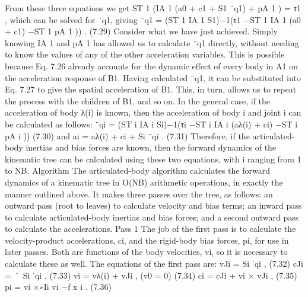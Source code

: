 From these three equations we get ST 1 (IA 1 (a0 + c1 + S1 ¨q1) + pA 1 ) = τ1 , which can be solved for ¨q1, giving ¨q1 = (ST 1 IA 1 S1)−1(τ1 −ST 1 IA 1 (a0 + c1) −ST 1 pA 1 )) . (7.29) Consider what we have just achieved. Simply knowing IA 1 and pA 1 has allowed us to calculate ¨q1 directly, without needing to know the values of any of the other acceleration variables. This is possible because Eq. 7.26 already accounts for the dynamic effect of every body in A1 on the acceleration response of B1. Having calculated ¨q1, it can be substituted into Eq. 7.27 to give the spatial acceleration of B1. This, in turn, allows us to repeat the process with the children of B1, and so on. In the general case, if the acceleration of body λ(i) is known, then the acceleration of body i and joint i can be calculated as follows: ¨qi = (ST i IA i Si)−1(τi −ST i IA i (aλ(i) + ci) −ST i pA i )) (7.30) and ai = aλ(i) + ci + Si ¨qi . (7.31) Therefore, if the articulated-body inertias and bias forces are known, then the forward dynamics of the kinematic tree can be calculated using these two equations, with i ranging from 1 to NB. Algorithm The articulated-body algorithm calculates the forward dynamics of a kinematic tree in O(NB) arithmetic operations, in exactly the manner outlined above. It makes three passes over the tree, as follows: an outward pass (root to leaves) to calculate velocity and bias terms; an inward pass to calculate articulated-body inertias and bias forces; and a second outward pass to calculate the accelerations. Pass 1 The job of the first pass is to calculate the velocity-product accelerations, ci, and the rigid-body bias forces, pi, for use in later passes. Both are functions of the body velocities, vi, so it is necessary to calculate these as well. The equations of the first pass are: vJi = Si ˙qi , (7.32) cJi = ˚ Si ˙qi , (7.33) vi = vλ(i) + vJi , (v0 = 0) (7.34) ci = cJi + vi × vJi , (7.35) pi = vi ×∗Ii vi −f x i . (7.36)

